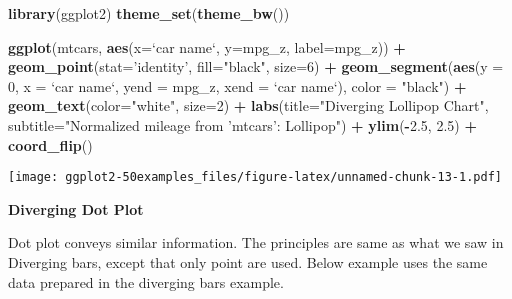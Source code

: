 \documentclass[a4paper]{article}
\newenvironment{Shaded}{\begin{snugshade}}{\end{snugshade}}
\newcommand{\KeywordTok}[1]{\textcolor[rgb]{0.13,0.29,0.53}{\textbf{#1}}}
\newcommand{\DataTypeTok}[1]{\textcolor[rgb]{0.13,0.29,0.53}{#1}}
\newcommand{\DecValTok}[1]{\textcolor[rgb]{0.00,0.00,0.81}{#1}}
\newcommand{\FloatTok}[1]{\textcolor[rgb]{0.00,0.00,0.81}{#1}}
\newcommand{\StringTok}[1]{\textcolor[rgb]{0.31,0.60,0.02}{#1}}
\newcommand{\OperatorTok}[1]{\textcolor[rgb]{0.81,0.36,0.00}{\textbf{#1}}}
\newcommand{\NormalTok}[1]{#1}
\begin{document}
\begin{Shaded}
\begin{Highlighting}[]
\KeywordTok{library}\NormalTok{(ggplot2)}
\KeywordTok{theme_set}\NormalTok{(}\KeywordTok{theme_bw}\NormalTok{())}

\KeywordTok{ggplot}\NormalTok{(mtcars, }\KeywordTok{aes}\NormalTok{(}\DataTypeTok{x=}\StringTok{`}\DataTypeTok{car name}\StringTok{`}\NormalTok{, }\DataTypeTok{y=}\NormalTok{mpg_z, }\DataTypeTok{label=}\NormalTok{mpg_z)) }\OperatorTok{+}\StringTok{ }
\StringTok{  }\KeywordTok{geom_point}\NormalTok{(}\DataTypeTok{stat=}\StringTok{'identity'}\NormalTok{, }\DataTypeTok{fill=}\StringTok{"black"}\NormalTok{, }\DataTypeTok{size=}\DecValTok{6}\NormalTok{)  }\OperatorTok{+}
\StringTok{  }\KeywordTok{geom_segment}\NormalTok{(}\KeywordTok{aes}\NormalTok{(}\DataTypeTok{y =} \DecValTok{0}\NormalTok{, }
                   \DataTypeTok{x =} \StringTok{`}\DataTypeTok{car name}\StringTok{`}\NormalTok{, }
                   \DataTypeTok{yend =}\NormalTok{ mpg_z, }
                   \DataTypeTok{xend =} \StringTok{`}\DataTypeTok{car name}\StringTok{`}\NormalTok{), }
               \DataTypeTok{color =} \StringTok{"black"}\NormalTok{) }\OperatorTok{+}
\StringTok{  }\KeywordTok{geom_text}\NormalTok{(}\DataTypeTok{color=}\StringTok{"white"}\NormalTok{, }\DataTypeTok{size=}\DecValTok{2}\NormalTok{) }\OperatorTok{+}
\StringTok{  }\KeywordTok{labs}\NormalTok{(}\DataTypeTok{title=}\StringTok{"Diverging Lollipop Chart"}\NormalTok{, }
       \DataTypeTok{subtitle=}\StringTok{"Normalized mileage from 'mtcars': Lollipop"}\NormalTok{) }\OperatorTok{+}\StringTok{ }
\StringTok{  }\KeywordTok{ylim}\NormalTok{(}\OperatorTok{-}\FloatTok{2.5}\NormalTok{, }\FloatTok{2.5}\NormalTok{) }\OperatorTok{+}
\StringTok{  }\KeywordTok{coord_flip}\NormalTok{()}
\end{Highlighting}
\end{Shaded}

\texttt{[image: ggplot2-50examples\_files/figure-latex/unnamed-chunk-13-1.pdf]}
\newpage

\textbf{Diverging Dot Plot}

Dot plot conveys similar information. The principles are same as what we
saw in Diverging bars, except that only point are used. Below example
uses the same data prepared in the diverging bars example.
\end{document}
